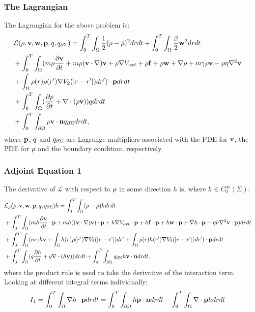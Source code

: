 \subsubsection*{The Lagrangian}
The Lagrangian for the above problem is:
\begin{align*}
&\mathcal{L}(\rho,\mathbf{v},\mathbf{w},\mathbf{p},q,q_{\partial \Sigma}) = \int_0^T \int_\Omega  \frac{1}{2}(\rho - \hat {\rho})^2 drdt  +\int_0^T \int_\Omega  \frac{\beta}{2}\mathbf{w}^2 drdt\\
&+ \int_0^T \int_\Omega (m \rho \frac{\partial \mathbf{v}}{\partial t} + m \rho (\mathbf{v} \cdot \nabla)\mathbf{v} + \rho \nabla V_{ext} + \rho \mathbf{f} + \rho \mathbf{w} + \nabla \rho + m\gamma \rho \mathbf{v}  - \rho \eta \nabla^2 \mathbf{v}\\
&+\int_\Omega \rho(r) \rho(r') \nabla V_2(|r-r'|)dr') \cdot \mathbf{p} dr dt\\
& + \int_0^T \int_\Omega (\frac{\partial \rho}{\partial t} + \nabla \cdot (\rho \mathbf{v})) q dr dt\\ 
& +\int_0^T \int_{\partial\Omega} \rho \mathbf{v} \cdot \mathbf{n} q_{\partial \Sigma} dr dt,
\end{align*}
where $\mathbf{p}$, $q$ and $q_{\partial \Sigma}$ are Lagrange multipliers associated with the PDE for $\mathbf{v}$, the PDE for $\rho$ and the boundary condition, respectively.
\subsubsection{Adjoint Equation 1}

The derivative of $\mathcal{L}$ with respect to $\rho$ in some direction $h$ is, where ${h} \in C_0^\infty(\Sigma) $:
\begin{align*}
&\mathcal{L}_\rho(\rho,\mathbf{v},\mathbf{w},\mathbf{p},q,q_{\partial \Sigma})h = \int_0^T \int_\Omega  (\rho - \hat {\rho})h drdt \\
&+ \int_0^T \int_\Omega (m h \frac{\partial \mathbf{v}}{\partial t}\cdot \mathbf{p} + m h( (\mathbf{v} \cdot \nabla)\mathbf{v} )\cdot \mathbf{p}+ h\nabla V_{ext}\cdot \mathbf{p} + h \mathbf{f} \cdot  \mathbf{p} + h \mathbf{w} \cdot \mathbf{p} + \nabla h\cdot \mathbf{p} - \eta h \nabla^2 \mathbf{v} \cdot \mathbf{p})  dr dt\\
&+ \int_0^T \int_\Omega (m\gamma h \mathbf{v} +\int_\Omega h(r) \rho(r') \nabla V_2(|r-r'|)dr'+\int_\Omega \rho(r) h(r') \nabla V_2(|r-r'|)dr') \cdot \mathbf{p} dr dt\\
& + \int_0^T \int_\Omega (q\frac{\partial h}{\partial t} + q\nabla \cdot (h \mathbf{v}))  dr dt +\int_0^T \int_{\partial\Omega} q_{\partial \Sigma} h\mathbf{v} \cdot \mathbf{n}  dr dt,
\end{align*}
where the product rule is used to take the derivative of the interaction term. Looking at different integral terms individually:
\begin{align*}
I_1= \int_0^T \int_\Omega \nabla h\cdot \mathbf{p} dr dt = \int_0^T \int_{\partial \Omega} h \mathbf{p} \cdot \mathbf{n} dr dt - \int_0^T \int_{\Omega} \nabla\cdot \mathbf{p} h dr dt
\end{align*}
 
